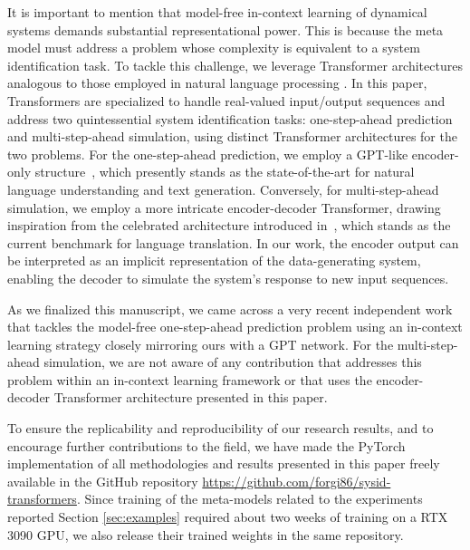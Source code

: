 \documentclass{article}
\begin{document}
It is important to mention that model-free in-context learning of dynamical systems demands substantial representational power. This is because the meta model must address a problem whose complexity is equivalent to a system identification task. To tackle this challenge, we leverage Transformer architectures analogous to those employed in natural language processing \cite{vaswani2017attention,radford2019language}. In this paper, Transformers are specialized to handle real-valued input/output sequences and address two quintessential system identification tasks: one-step-ahead prediction and multi-step-ahead simulation, using distinct Transformer architectures for the two problems. For the one-step-ahead prediction, we employ a GPT-like encoder-only structure~\cite{radford2019language}, which presently stands as the state-of-the-art for natural language understanding and text generation.   Conversely, for multi-step-ahead simulation, we employ a more intricate encoder-decoder Transformer, drawing inspiration from the celebrated architecture introduced in~\cite{vaswani2017attention}, which stands as the current benchmark for language translation. In our work, the encoder output can be interpreted as an implicit representation of the data-generating system, enabling the decoder to simulate the system’s response to new input sequences. 

 

As we finalized this manuscript, we came across a very recent independent work~\cite{balim2023can} that tackles the model-free one-step-ahead prediction problem using an in-context learning strategy closely mirroring ours with a GPT network. For the multi-step-ahead simulation, we are not aware of any contribution that addresses this problem within an in-context learning framework or that uses the encoder-decoder Transformer architecture presented in this paper.


To ensure the replicability and reproducibility of our research results, and to encourage further contributions to the field, we have made the PyTorch implementation of all methodologies and results presented in this paper freely available in the GitHub repository \href{https://github.com/forgi86/sysid-transformers}{https://github.com/forgi86/sysid-transformers}. Since training of the meta-models related to the experiments reported Section \ref{sec:examples} required about two weeks of training on a RTX 3090 GPU,  we also release  their trained weights in the same repository. 
 
\end{document}
